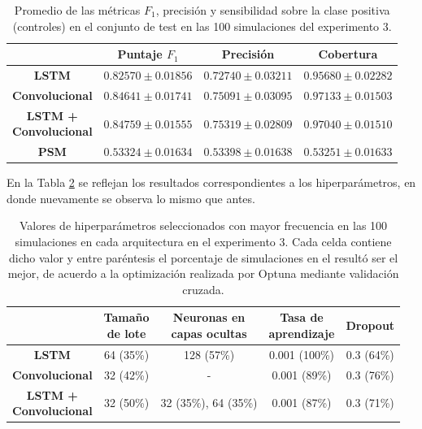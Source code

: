 \documentclass[../../main.tex]{subfiles}
\begin{document}
\begin{table}[ht]
    \centering
    \renewcommand{\arraystretch}{1.2}
    \begin{tabular}{|c|c|c|c|}
        \hline
         & \textbf{Puntaje} \(F_1\) & \textbf{Precisión} & \textbf{Cobertura} \\ \hline\hline
        \textbf{LSTM}
            & $0.82570 \pm 0.01856$ & $0.72740 \pm 0.03211$ & $0.95680 \pm 0.02282$ \\ \hline
        \textbf{Convolucional}
            & $0.84641 \pm 0.01741$ & $0.75091 \pm 0.03095$ & $\mathbf{0.97133 \pm 0.01503}$ \\ \hline
        \makecell{\textbf{LSTM +} \\ \textbf{Convolucional}}
            & $\mathbf{0.84759 \pm 0.01555}$ & $\mathbf{0.75319 \pm 0.02809}$ & $0.97040 \pm 0.01510$ \\ \hline
        \textbf{PSM}
            & $0.53324 \pm 0.01634$ & $0.53398 \pm 0.01638$ & $0.53251 \pm 0.01633$ \\
        \hline
    \end{tabular}
    \caption{Promedio de las métricas \(F_1\), precisión y sensibilidad sobre la
    clase positiva (controles) en el conjunto de test en las 100 simulaciones del
    experimento 3.}
    \label{tab:results_exp3}
\end{table}

En la Tabla \ref{tab:hyperparams_exp3} se reflejan los resultados correspondientes
a los hiperparámetros, en donde nuevamente se observa lo mismo que antes.

\begin{table}[H]
    \centering
    \renewcommand{\arraystretch}{1.2}
    \begin{tabular}{|c|c|c|c|c|}
        \hline
            & \makecell{\textbf{Tamaño}\\\textbf{de lote}}
            & \makecell{\textbf{Neuronas en}\\\textbf{capas ocultas}}
            & \makecell{\textbf{Tasa de}\\\textbf{aprendizaje}}
            & \textbf{Dropout} \\ \hline\hline
        \textbf{LSTM}
            & 64 (35\%) & 128 (57\%) & 0.001 (100\%) & 0.3 (64\%) \\ \hline
        \textbf{Convolucional}
            & 32 (42\%) & -          & 0.001 (89\%)  & 0.3 (76\%) \\ \hline
        \makecell{\textbf{LSTM +}\\\textbf{Convolucional}}
            & 32 (50\%) & 32 (35\%), 64 (35\%) & 0.001 (87\%) & 0.3 (71\%) \\
        \hline
    \end{tabular}
    \caption{Valores de hiperparámetros seleccionados con mayor frecuencia en las 100
    simulaciones en cada arquitectura en el experimento 3. Cada celda contiene dicho valor
    y entre paréntesis el porcentaje de simulaciones en el resultó ser el mejor, de
    acuerdo a la optimización realizada por Optuna mediante validación cruzada.}
    \label{tab:hyperparams_exp3}
\end{table}
\end{document}
